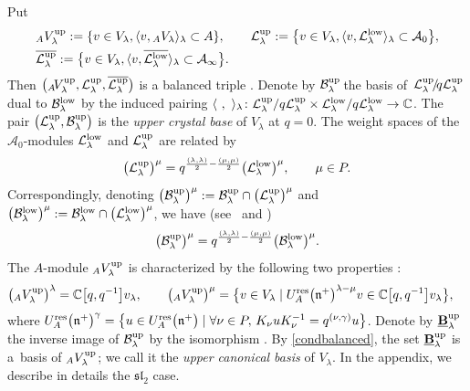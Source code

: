 \documentclass[10pt,a4paper]{amsart}
\numberwithin{equation}{section}
\theoremstyle{definition}
\newcommand{\mc}{\mathbb{C}}
\newcommand{\Ll}{{\mathcal L}}
\newcommand{\ra}{\rightarrow}
\begin{document}
Put
\begin{align}
& {}_AV_\lambda^{\rm up} := \{v\in V_\lambda, \langle v,{}_AV_\lambda\rangle_\lambda\subset A\},\qquad
\Ll_{\lambda}^{\rm up} := \big\{v\in V_\lambda, \langle v,\Ll_{\lambda}^{\rm low}\rangle_\lambda\subset \mathcal{A}_0\big\},\nonumber\\
&\overline{\Ll_{\lambda}^{\rm up}} := \big\{v\in V_\lambda, \langle v,\overline{\Ll_{\lambda}^{\rm low}}\rangle_\lambda\subset \mathcal{A}_\infty\big\}.\label{upmodule}
\end{align}
Then $\big({}_A\!V_\lambda^{\rm up},\Ll_{\lambda}^{\rm up},\overline{\Ll_{\lambda}^{\rm up}}\big)$ is a balanced triple \cite[Lemma 4.2.1]{Kashiwara2}. Denote by $\mathcal{B}_\lambda^{\rm up}\!$ the basis of~${\Ll_{\lambda}^{\rm up}\!/\!q\Ll_{\lambda}^{\rm up}}$ dual to $\mathcal{B}_\lambda^{\rm low}$ by the induced pairing $\langle\ ,\ \rangle_\lambda\colon \Ll_{\lambda}^{\rm up}/q\Ll_{\lambda}^{\rm up} \times \Ll_{\lambda}^{\rm low}/q\Ll_{\lambda}^{\rm low} \ra \mc$. The pair $\big(\Ll_{\lambda}^{\rm up},\mathcal{B}_\lambda^{\rm up}\big)$ is the {\it upper crystal base} of $V_\lambda$ at $q=0$. The weight spaces of the $\mathcal{A}_0$-modules $\Ll_{\lambda}^{\rm low}$ and $\Ll_{\lambda}^{\rm up}$ are related by
\begin{equation}\label{renormweightA} \big(\Ll_{\lambda}^{\rm up}\big)^\mu = q^{\frac{(\lambda,\lambda)}{2} - \frac{(\mu,\mu)}{2}} \big(\Ll_{\lambda}^{\rm low}\big)^\mu , \qquad \mu\in P. \end{equation}
Correspondingly, denoting $\big(\mathcal{B}_\lambda^{\rm up}\big)^\mu := \mathcal{B}_\lambda^{\rm up} \cap \big(\Ll_\lambda^{\rm up}\big)^\mu$ and $\big(\mathcal{B}_\lambda^{\rm low}\big)^\mu := \mathcal{B}_\lambda^{\rm low} \cap \big(\Ll_\lambda^{\rm low}\big)^\mu$, we have (see~\cite{Kashiwara1} and \cite[equation~(4.2.9)]{Kashiwara2})
\[\big(\mathcal{B}_\lambda^{\rm up}\big)^\mu = q^{\frac{(\lambda,\lambda)}{2} - \frac{(\mu,\mu)}{2}} \big(\mathcal{B}_\lambda^{\rm low}\big)^\mu.\]
The $A$-module ${}_AV_\lambda^{\rm up}$ is characterized by the following two properties \cite[equations~(4.2.10)--(4.2.12)]{Kashiwara2}:
\begin{align*}
\big({}_AV_\lambda^{\rm up}\big)^\lambda & = \mc\big[q,q^{-1}\big]v_\lambda,\qquad
\big({}_AV_\lambda^{\rm up}\big)^\mu = \bigl\{v\in V_\lambda \mid U_A^{\rm res}\big(\mathfrak{n}^+\big)^{\lambda-\mu} v \in \mc\big[q,q^{-1}\big]v_\lambda\bigr\},
\end{align*}
where $U_A^{\rm res}\big(\mathfrak{n}^+\big)^{\gamma} = \big\{u\in U_A^{\rm res}\big(\mathfrak{n}^+\big) \mid \forall \nu\in P, \, K_\nu uK_\nu^{-1} = q^{(\nu,\gamma)}u\big\}$. Denote by $\underline{\mathbf{B}}_\lambda^{\rm up}$ the inverse image of $\mathcal{B}_\lambda^{\rm up}$ by the isomorphism \smash{${}_AV_\lambda^{\rm up}\cap \Ll_{\lambda}^{\rm up}\cap \overline{\Ll_{\lambda}^{\rm up}} \ra \Ll_{\lambda}^{\rm up}/q\Ll_{\lambda}^{\rm up}$}. By \eqref{condbalanced}, the set $\underline{\mathbf{B}}_\lambda^{\rm up}$ is a~basis of ${}_AV_\lambda^{\rm up}$; we call it the {\it upper canonical basis} of $V_\lambda$. In the appendix, we describe in details the ${\mathfrak{sl}_2}$ case.
\end{document}
